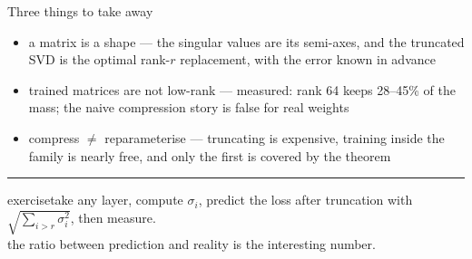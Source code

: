 \documentclass[aspectratio=169,11pt]{beamer}
\newcommand{\hl}[1]{{\color{accent}#1}}
\begin{document}
\begin{frame}{Three things to take away}
  \vspace{4pt}
  \begin{itemize}\itemsep10pt
    \item \hl{a matrix is a shape} --- the singular values are its semi-axes, and
          the truncated SVD is the optimal rank-$r$ replacement, with the error
          known in advance
    \item \hl{trained matrices are not low-rank} --- measured: rank 64 keeps
          28--45\% of the mass; the naive compression story is false for real weights
    \item \hl{compress $\ne$ reparameterise} --- truncating is expensive,
          training inside the family is nearly free, and only the first is
          covered by the theorem
  \end{itemize}

  \vspace{10pt}
  {\color{hairline}\rule{\textwidth}{0.6pt}}
  \vspace{6pt}
  {\ttfamily\scriptsize\color{stone}
  exercise\quad take any layer, compute $\sigma_i$, predict the loss after
  truncation with $\sqrt{\sum_{i>r}\sigma_i^2}$, then measure.\\
  \hspace*{2.9em}the ratio between prediction and reality is the interesting number.}
\end{frame}
\end{document}
